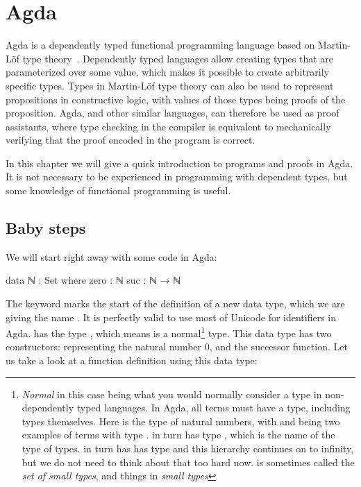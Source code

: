 
\chapter{Agda} \label{Agda}

	Agda is a dependently typed functional programming language based on
	Martin-Löf type theory~\cite{martin84}. Dependently typed languages allow
	creating types that are parameterized over some value, which makes it
	possible to create arbitrarily specific types. Types in Martin-Löf type
	theory can also be used to represent propositions in constructive logic,
	with values of those types being proofs of the proposition. Agda, and other
	similar languages, can therefore be used as proof assistants, where type
	checking in the compiler is equivalent to mechanically verifying that the
	proof encoded in the program is correct.

	In this chapter we will give a quick introduction to programs and proofs in
	Agda. It is not necessary to be experienced in programming with dependent
	types, but some knowledge of functional programming is useful.

	\section{Baby steps}

		We will start right away with some code in Agda:

		\begin{code}
			data ℕ : Set where
			  zero  :  ℕ
			  suc   :  ℕ → ℕ
		\end{code}

		The keyword  marks the start of the definition of a new
		data type, which we are giving the name . It is perfectly
		valid to use most of Unicode for identifiers in Agda.  has
		the type , which means  is a normal\footnote{
		\emph{Normal} in this case being what you would normally consider a
		type in non-dependently typed languages. In Agda, all terms must have a
		type, including types themselves. Here  is the type of
		natural numbers, with  and  being
		two examples of terms with type .  in turn has type
		, which is the name of the type of types.   in
		turn has has type  and this hierarchy continues on to
		infinity, but we do not need to think about that too hard now.
		 is sometimes called the \emph{set of small types}, and
		things in  \emph{small types}} type. This data type has two
		constructors:  representing the natural number $0$, and
		 the successor function. Let us take a look at a function
		definition using this data type:


